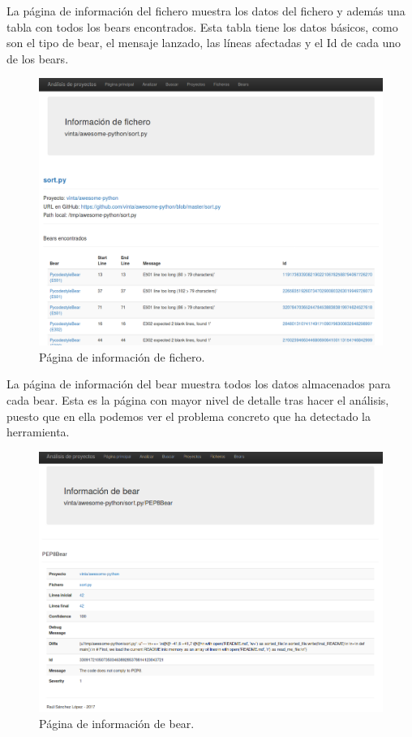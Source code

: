 \documentclass[a4paper, 12pt]{book}
\begin{document}
La página de información del fichero muestra los datos del fichero y además una tabla con todos los bears encontrados. Esta tabla tiene los datos básicos, como son el tipo de bear, el mensaje lanzado, las líneas afectadas y el Id de cada uno de los bears.
\begin{figure}[H]
  \centering
  \includegraphics[width=12cm, keepaspectratio]{img/infoFichero}
  \caption{Página de información de fichero.}
  \label{fig:infoFichero}
\end{figure}

La página de información del bear muestra todos los datos almacenados para cada bear. Esta es la página con mayor nivel de detalle tras hacer el análisis, puesto que en ella podemos ver el problema concreto que ha detectado la herramienta.
\begin{figure}[H]
  \centering
  \includegraphics[width=12cm, keepaspectratio]{img/infoBear}
  \caption{Página de información de bear.}
  \label{fig:infoBear}
\end{figure}
\end{document}
